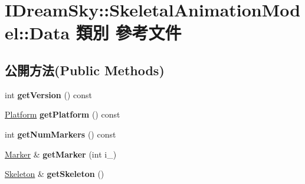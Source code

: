 \hypertarget{class_i_dream_sky_1_1_skeletal_animation_model_1_1_data}{}\section{I\+Dream\+Sky\+:\+:Skeletal\+Animation\+Model\+:\+:Data 類別 參考文件}
\label{class_i_dream_sky_1_1_skeletal_animation_model_1_1_data}
\subsection*{公開方法(Public Methods)}
\begin{DoxyCompactItemize}
\item 
int {\bfseries get\+Version} () const \hypertarget{class_i_dream_sky_1_1_skeletal_animation_model_1_1_data_a2511ceaba3f2abdb4ed405fce342192b}{}\label{class_i_dream_sky_1_1_skeletal_animation_model_1_1_data_a2511ceaba3f2abdb4ed405fce342192b}

\item 
\hyperlink{class_i_dream_sky_1_1_platform}{Platform} {\bfseries get\+Platform} () const \hypertarget{class_i_dream_sky_1_1_skeletal_animation_model_1_1_data_a09752d3acda35340ca76087cc54bbeea}{}\label{class_i_dream_sky_1_1_skeletal_animation_model_1_1_data_a09752d3acda35340ca76087cc54bbeea}

\item 
int {\bfseries get\+Num\+Markers} () const \hypertarget{class_i_dream_sky_1_1_skeletal_animation_model_1_1_data_a664b455da16635622260762144bd2b8b}{}\label{class_i_dream_sky_1_1_skeletal_animation_model_1_1_data_a664b455da16635622260762144bd2b8b}

\item 
\hyperlink{class_i_dream_sky_1_1_skeletal_animation_model_1_1_marker}{Marker} \& {\bfseries get\+Marker} (int i\+\_\+)\hypertarget{class_i_dream_sky_1_1_skeletal_animation_model_1_1_data_af4ee551b91e3179dd24442d3d1ca8455}{}\label{class_i_dream_sky_1_1_skeletal_animation_model_1_1_data_af4ee551b91e3179dd24442d3d1ca8455}

\item 
\hyperlink{class_i_dream_sky_1_1_skeletal_animation_model_1_1_skeleton}{Skeleton} \& {\bfseries get\+Skeleton} ()\hypertarget{class_i_dream_sky_1_1_skeletal_animation_model_1_1_data_ac5c5507ff7f52527635e02ef080f8429}{}\label{class_i_dream_sky_1_1_skeletal_animation_model_1_1_data_ac5c5507ff7f52527635e02ef080f8429}


\end{DoxyCompactItemize}
